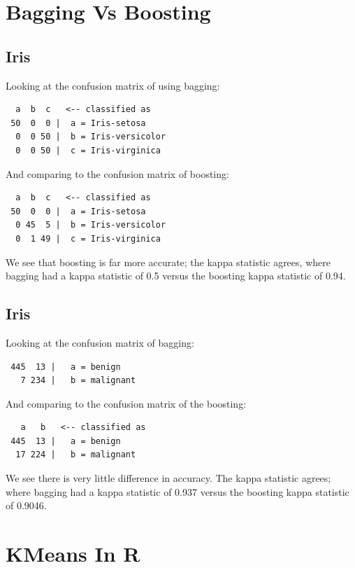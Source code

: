 \documentclass[12pt]{scrartcl}
\begin{document}
\section{Bagging Vs Boosting}
\subsection{Iris}
Looking at the confusion matrix of using bagging:

\begin{verbatim}
  a  b  c   <-- classified as
 50  0  0 |  a = Iris-setosa
  0  0 50 |  b = Iris-versicolor
  0  0 50 |  c = Iris-virginica
\end{verbatim}

And comparing to the confusion matrix of boosting:

\begin{verbatim}
  a  b  c   <-- classified as
 50  0  0 |  a = Iris-setosa
  0 45  5 |  b = Iris-versicolor
  0  1 49 |  c = Iris-virginica
\end{verbatim}

We see that boosting is far more accurate; the kappa statistic agrees, where bagging had a kappa statistic of 0.5 versus the boosting kappa statistic of 0.94.

\subsection{Iris}
Looking at the confusion matrix of bagging:

\begin{verbatim}
 445  13 |   a = benign
   7 234 |   b = malignant
\end{verbatim}

And comparing to the confusion matrix of the boosting:

\begin{verbatim}
   a   b   <-- classified as
 445  13 |   a = benign
  17 224 |   b = malignant
\end{verbatim}

We see there is very little difference in accuracy. The kappa statistic agrees; where bagging had a kappa statistic of 0.937 versus the boosting kappa statistic of 0.9046.

\section{KMeans In R}
% 
\end{document}

